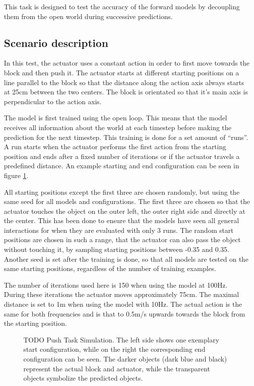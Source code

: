 This task is designed to test the accuracy of the forward models by decoupling them from the open 
world during successive predictions. 

\subsection{Scenario description}

In this test, the actuator uses a constant action in order to first move towards the block and then push it.
The actuator starts at different starting positions on a line parallel to the block so that the distance along
the action axis always starts at 25cm between the two centers. The block is orientated so that it's main axis
is perpendicular to the action axis.

The model is first trained using the open loop. This means that the model receives all information about the
world at each timestep before making the prediction for the next timestep. This training is done for a set amount
of \enquote{runs}. A run starts when the actuator performs the first action from the starting position and ends after a fixed 
number of iterations or if the actuator travels a predefined distance.
An example starting and end configuration can be seen in figure \ref{fig:pushTaskSim}. 

All starting positions except the first three are chosen randomly, but using the
same seed for all models and configurations. %
The first three are chosen so that the actuator touches the object on the outer left, the outer right side
and directly at the center. This has been done to ensure that the models have seen all general interactions for when they are evaluated with only 3
runs. The random start positions are chosen in such a range, that the actuator can also pass the object without touching it, by sampling starting positions
between -0.35 and 0.35. Another seed is set after the training is done, so that all models are tested on the same starting positions, regardless of
the number of training examples.

The number of iterations used here is 150 when using
the model at 100Hz. During these iterations the actuator moves approximately 75cm. The maximal distance is set to 1m when using the
model with 10Hz. The actual action is the same for both frequencies and is that to 0.5m/s upwards towards the block from the starting
position. 

\begin{figure}
	
	\caption{TODO Push Task Simulation. The left side shows one exemplary start configuration, while on the right the corresponding end configuration can be seen.
		The darker objects (dark blue and black) represent the actual block and actuator, while the transparent objects symbolize the predicted objects.}
	\label{fig:pushTaskSim}
\end{figure}


